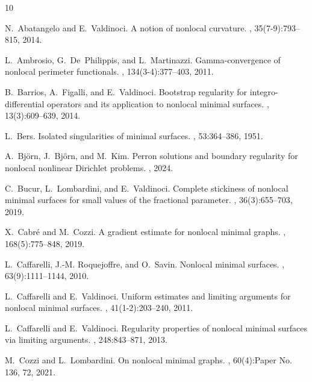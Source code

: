 \documentclass{amsart}
\theoremstyle{plain}
\theoremstyle{definition}
\numberwithin{equation}{section}
\begin{document}
\begin{thebibliography}{10}

N.~Abatangelo and E.~Valdinoci.
\newblock A notion of nonlocal curvature.
, 35(7-9):793--815, 2014.

L.~Ambrosio, G.~De~Philippis, and L.~Martinazzi.
\newblock Gamma-convergence of nonlocal perimeter functionals.
, 134(3-4):377--403, 2011.

B.~Barrios, A.~Figalli, and E.~Valdinoci.
\newblock Bootstrap regularity for integro-differential operators and its
  application to nonlocal minimal surfaces.
, 13(3):609--639, 2014.

L.~Bers.
\newblock Isolated singularities of minimal surfaces.
, 53:364--386, 1951.

A.~Bj{\"o}rn, J.~Bj{\"o}rn, and M.~Kim.
\newblock Perron solutions and boundary regularity for nonlocal nonlinear
  {D}irichlet problems.
, 2024.

C.~Bucur, L.~Lombardini, and E.~Valdinoci.
\newblock Complete stickiness of nonlocal minimal surfaces for small values of
  the fractional parameter.
,
  36(3):655--703, 2019.

X.~Cabr\'e and M.~Cozzi.
\newblock A gradient estimate for nonlocal minimal graphs.
, 168(5):775--848, 2019.

L.~Caffarelli, J.-M. Roquejoffre, and O.~Savin.
\newblock Nonlocal minimal surfaces.
, 63(9):1111--1144, 2010.

L.~Caffarelli and E.~Valdinoci.
\newblock Uniform estimates and limiting arguments for nonlocal minimal
  surfaces.
, 41(1-2):203--240,
  2011.

L.~Caffarelli and E.~Valdinoci.
\newblock Regularity properties of nonlocal minimal surfaces via limiting
  arguments.
, 248:843--871, 2013.

M.~Cozzi and L.~Lombardini.
\newblock On nonlocal minimal graphs.
, 60(4):Paper No. 136,
  72, 2021.


\end{thebibliography}
\end{document}
